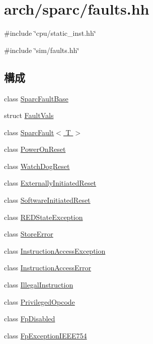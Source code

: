 \hypertarget{arch_2sparc_2faults_8hh}{
\section{arch/sparc/faults.hh}
\label{arch_2sparc_2faults_8hh}
}
{\ttfamily \#include \char`\"{}cpu/static\_\-inst.hh\char`\"{}}\par
{\ttfamily \#include \char`\"{}sim/faults.hh\char`\"{}}\par
\subsection*{構成}
\begin{DoxyCompactItemize}
\item 
class \hyperlink{classSparcISA_1_1SparcFaultBase}{SparcFaultBase}
\item 
struct \hyperlink{structSparcISA_1_1SparcFaultBase_1_1FaultVals}{FaultVals}
\item 
class \hyperlink{classSparcISA_1_1SparcFault}{SparcFault$<$ T $>$}
\item 
class \hyperlink{classSparcISA_1_1PowerOnReset}{PowerOnReset}
\item 
class \hyperlink{classSparcISA_1_1WatchDogReset}{WatchDogReset}
\item 
class \hyperlink{classSparcISA_1_1ExternallyInitiatedReset}{ExternallyInitiatedReset}
\item 
class \hyperlink{classSparcISA_1_1SoftwareInitiatedReset}{SoftwareInitiatedReset}
\item 
class \hyperlink{classSparcISA_1_1REDStateException}{REDStateException}
\item 
class \hyperlink{classSparcISA_1_1StoreError}{StoreError}
\item 
class \hyperlink{classSparcISA_1_1InstructionAccessException}{InstructionAccessException}
\item 
class \hyperlink{classSparcISA_1_1InstructionAccessError}{InstructionAccessError}
\item 
class \hyperlink{classSparcISA_1_1IllegalInstruction}{IllegalInstruction}
\item 
class \hyperlink{classSparcISA_1_1PrivilegedOpcode}{PrivilegedOpcode}
\item 
class \hyperlink{classSparcISA_1_1FpDisabled}{FpDisabled}
\item 
class \hyperlink{classSparcISA_1_1FpExceptionIEEE754}{FpExceptionIEEE754}
\item 

\end{DoxyCompactItemize}
